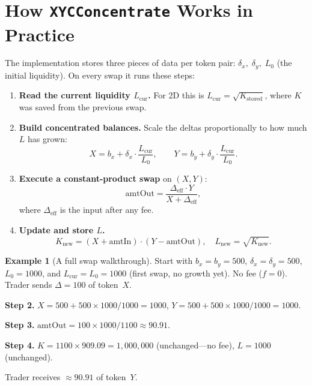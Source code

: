 \documentclass[11pt]{article}
\theoremstyle{definition}
\newtheorem{example}{Example}
\begin{document}
\section{How \texttt{XYCConcentrate} Works in Practice}\label{sec:impl-overview}

The implementation stores three pieces of data per token pair:
$\delta_x,\; \delta_y,\; L_0$ (the initial liquidity).
On every swap it runs these steps:

\begin{enumerate}[label=\textbf{Step \arabic*},leftmargin=3em]
\item \textbf{Read the current liquidity $L_{\mathrm{cur}}$.}
  For 2D this is $L_{\mathrm{cur}} = \sqrt{K_{\mathrm{stored}}}$, where $K$ was
  saved from the previous swap.

\item \textbf{Build concentrated balances.}
  Scale the deltas proportionally to how much $L$ has grown:
  \begin{equation}\label{eq:concentrate}
  X = b_x + \delta_x \cdot \frac{L_{\mathrm{cur}}}{L_0}, \qquad
  Y = b_y + \delta_y \cdot \frac{L_{\mathrm{cur}}}{L_0}.
  \end{equation}

\item \textbf{Execute a constant-product swap} on $(X, Y)$:
  \begin{equation}\label{eq:swap}
  \mathrm{amtOut} = \frac{\Delta_{\mathrm{eff}} \cdot Y}{X + \Delta_{\mathrm{eff}}},
  \end{equation}
  where $\Delta_{\mathrm{eff}}$ is the input after any fee.

\item \textbf{Update and store $L$.}
  \begin{equation}\label{eq:L-update}
  K_{\mathrm{new}} = (X + \mathrm{amtIn}) \cdot (Y - \mathrm{amtOut}),
  \quad
  L_{\mathrm{new}} = \sqrt{K_{\mathrm{new}}}.
  \end{equation}
\end{enumerate}

\begin{example}[A full swap walkthrough]\label{ex:walkthrough}
Start with $b_x = b_y = 500$, $\delta_x = \delta_y = 500$,
$L_0 = 1000$, and $L_{\mathrm{cur}} = L_0 = 1000$ (first swap, no growth yet).
No fee ($f = 0$).  Trader sends $\Delta = 100$ of token~$X$.

\textbf{Step 2.}
$X = 500 + 500 \times 1000/1000 = 1000$, \;
$Y = 500 + 500 \times 1000/1000 = 1000$.

\textbf{Step 3.}
$\mathrm{amtOut} = 100 \times 1000 / 1100 \approx 90.91$.

\textbf{Step 4.}
$K = 1100 \times 909.09 = 1{,}000{,}000$ (unchanged---no fee), \;
$L = 1000$ (unchanged).

Trader receives $\approx 90.91$ of token~$Y$.
\end{example}
\end{document}
